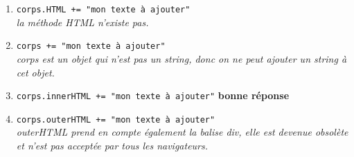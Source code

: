 \documentclass[]{scrartcl}
\begin{document}
\begin{enumerate}
                    \begin{enumerate}
                        \item \texttt{corps.HTML += "mon texte à ajouter"} \\\textit{ la méthode HTML n'existe pas.}
                        \item \texttt{corps += "mon texte à ajouter"} \\  \textit{corps est un objet qui n'est pas un string, donc on ne peut ajouter un string à cet objet.}
                        \item \texttt{corps.innerHTML += "mon texte à ajouter"} \textbf{bonne réponse}
                        \item \texttt{corps.outerHTML += "mon texte à ajouter"} \\ \textit{outerHTML prend en compte également la balise div, elle est devenue obsolète et n'est pas acceptée par tous les navigateurs.}
                    \end{enumerate}
                \end{enumerate}
            
\end{document}
